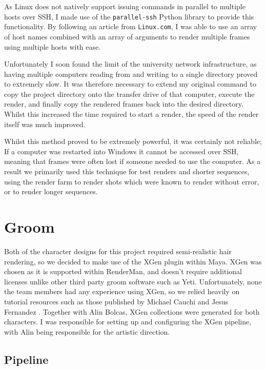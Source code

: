 \documentclass[11pt]{article}
\begin{document}
As Linux does not natively support issuing commands in parallel to multiple hosts over SSH, I made use of the \texttt{parallel-ssh}\cite{pssh} Python library to provide this functionality. By following an article from \texttt{Linux.com}\cite{martin_2008}, I was able to use an array of host names combined with an array of arguments to render multiple frames using multiple hosts with ease.

Unfortunately I soon found the limit of the university network infrastructure, as having multiple computers reading from and writing to a single directory proved to extremely slow. It was therefore necessary to extend my original command to copy the project directory onto the transfer drive of that computer, execute the render, and finally copy the rendered frames back into the desired directory. Whilst this increased the time required to start a render, the speed of the render itself was much improved.

Whilst this method proved to be extremely powerful, it was certainly not reliable; If a computer was restarted into Windows it cannot be accessed over SSH, meaning that frames were often lost if someone needed to use the computer. As a result we primarily used this technique for test renders and shorter sequences, using the render farm to render shots which were known to render without error, or to render longer sequences.

\section{Groom}

Both of the character designs for this project required semi-realistic hair rendering, so we decided to make use of the XGen plugin within Maya. XGen was chosen as it is supported within RenderMan, and doesn't require additional licenses unlike other third party groom software such as Yeti. Unfortunately, none the team members had any experience using XGen, so we relied heavily on tutorial resources such as those published by Michael Cauchi \cite{cauchi_2017} and Jesus Fernandez \cite{fernandez_2018}. Together with Alin Bolcas, XGen collections were generated for both characters. I was responsible for setting up and configuring the XGen pipeline, with Alin being responsible for the artistic direction.

\subsection{Pipeline} \label{threadsafe}
\end{document}
